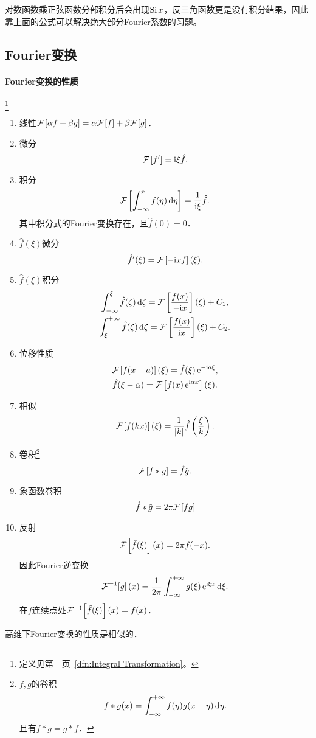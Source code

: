 对数函数乘正弦函数分部积分后会出现$\Si x$，反三角函数更是没有积分结果，因此靠上面的公式可以解决绝大部分Fourier系数的习题。
\subsection{Fourier变换}
\paragraph*{Fourier变换的性质}\label{The Property of Fourier Transformation}\footnote{定义见第~\pageref{dfn:Integral Transformation}~页~\ref{dfn:Integral Transformation}。}
\begin{enumerate}
	\item 线性\qquad\qquad$\cf{\alpha f+\beta g}=\alpha\cf f+\beta\cf g$．
	\item 微分
			\[\cf{f'}=\i\xi\hat f.\]
	\item 积分
			\[\cf{\int_{-\infty}^xf(\eta)\d\eta}=\frac1{\i\xi}\hat f.\]
			其中积分式的Fourier变换存在，且$\hat f(0)=0$．
	\item $\hat f(\xi)$微分
			\[\hat f'(\xi)=\cf{-\i xf}(\xi).\]
	\item $\hat f(\xi)$积分
			\begin{gather}
				\int_{-\infty}^\xi\hat f(\zeta)\d\zeta=\mathcal F\fkh{\frac{f(x)}{-\i x}}(\xi)+C_1,\\
				\int_\xi^{+\infty}\hat f(\zeta)\d\zeta=\mathcal F\fkh{\frac{f(x)}{\i x}}(\xi)+C_2.
			\end{gather}
	\item 位移性质
			\begin{gather*}
				\cf{f(x-a)}(\xi)=\hat f(\xi)\e{-\i a\xi},\\
				\hat f(\xi-\alpha)=\cf{f(x)\e{\i\alpha x}}(\xi).
			\end{gather*}
	\item 相似
			\[\cf{f(kx)}(\xi)=\frac1{\abs k}\hat f\kh{\frac\xi{k}}.\]
	\item 卷积\footnote{$f,g$的卷积\[f\ast g(x)=\int\iti f(\eta)g(x-\eta)\d\eta.\]且有$f\ast g=g\ast f$．}
			\[\cf{f\ast g}=\hat f\hat g.\]
	\item 象函数卷积
			\[\hat f\ast\hat g=2\pi\cf{fg}\]
	\item 反射
			\[\cf{\hat f(\xi)}(x)=2\pi f(-x).\]
			因此Fourier逆变换
			\[\cfi g(x)=\frac1{2\pi}\int\iti g(\xi)\e{\i\xi x}\d\xi.\]
			在$f$连续点处$\cfi{\hat f(\xi)}(x)=f(x)$．
\end{enumerate}
高维下Fourier变换的性质是相似的．
